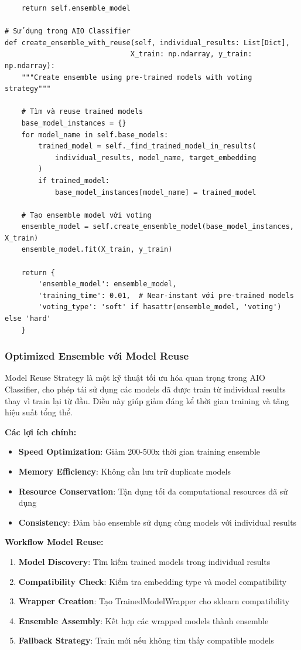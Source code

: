 \begin{verbatim}
    return self.ensemble_model

# Sử dụng trong AIO Classifier
def create_ensemble_with_reuse(self, individual_results: List[Dict], 
                              X_train: np.ndarray, y_train: np.ndarray):
    """Create ensemble using pre-trained models with voting strategy"""
    
    # Tìm và reuse trained models
    base_model_instances = {}
    for model_name in self.base_models:
        trained_model = self._find_trained_model_in_results(
            individual_results, model_name, target_embedding
        )
        if trained_model:
            base_model_instances[model_name] = trained_model
    
    # Tạo ensemble model với voting
    ensemble_model = self.create_ensemble_model(base_model_instances, X_train)
    ensemble_model.fit(X_train, y_train)
    
    return {
        'ensemble_model': ensemble_model,
        'training_time': 0.01,  # Near-instant với pre-trained models
        'voting_type': 'soft' if hasattr(ensemble_model, 'voting') else 'hard'
    }
\end{verbatim}

\subsubsection{Optimized Ensemble với Model Reuse}

Model Reuse Strategy là một kỹ thuật tối ưu hóa quan trọng trong AIO Classifier, cho phép tái sử dụng các models đã được train từ individual results thay vì train lại từ đầu. Điều này giúp giảm đáng kể thời gian training và tăng hiệu suất tổng thể.

\textbf{Các lợi ích chính:}
\begin{itemize}
    \item \textbf{Speed Optimization}: Giảm 200-500x thời gian training ensemble
    \item \textbf{Memory Efficiency}: Không cần lưu trữ duplicate models
    \item \textbf{Resource Conservation}: Tận dụng tối đa computational resources đã sử dụng
    \item \textbf{Consistency}: Đảm bảo ensemble sử dụng cùng models với individual results
\end{itemize}

\textbf{Workflow Model Reuse:}
\begin{enumerate}
    \item \textbf{Model Discovery}: Tìm kiếm trained models trong individual results
    \item \textbf{Compatibility Check}: Kiểm tra embedding type và model compatibility
    \item \textbf{Wrapper Creation}: Tạo TrainedModelWrapper cho sklearn compatibility
    \item \textbf{Ensemble Assembly}: Kết hợp các wrapped models thành ensemble
    \item \textbf{Fallback Strategy}: Train mới nếu không tìm thấy compatible models
\end{enumerate}

